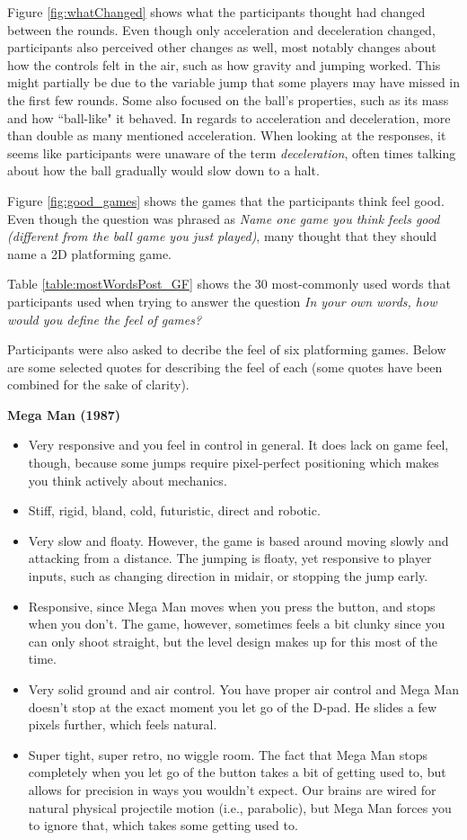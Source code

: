 Figure \ref{fig:whatChanged} shows what the participants thought had changed between the rounds. Even though only acceleration and deceleration changed, participants also perceived other changes as well, most notably changes about how the controls felt in the air, such as how gravity and jumping worked. This might partially be due to the variable jump that some players may have missed in the first few rounds. Some also focused on the ball's properties, such as its mass and how ``ball-like" it behaved. In regards to acceleration and deceleration, more than double as many mentioned acceleration. When looking at the responses, it seems like participants were unaware of the term \textit{deceleration}, often times talking about how the ball gradually would slow down to a halt.

Figure \ref{fig:good_games} shows the games that the participants think feel good. Even though the question was phrased as \textit{Name one game you think feels good (different from the ball game you just played)}, many thought that they should name a 2D platforming game.

Table \ref{table:mostWordsPost_GF} shows the 30 most-commonly used words that participants used when trying to answer the question \textit{In your own words, how would you define the feel of games?}

Participants were also asked to decribe the feel of six platforming games. Below are some selected quotes for describing the feel of each (some quotes have been combined for the sake of clarity).

\textbf{Mega Man (1987)}
\vspace{-5mm}
\begin{itemize}[noitemsep,nolistsep]
\item Very responsive and you feel in control in general. It does lack on game feel, though, because some jumps require pixel-perfect positioning which makes you think actively about mechanics.
\item Stiff, rigid, bland, cold, futuristic, direct and robotic.
\item Very slow and floaty. However, the game is based around moving slowly and attacking from a distance. The jumping is floaty, yet responsive to player inputs, such as changing direction in midair, or stopping the jump early. 
\item Responsive, since Mega Man moves when you press the button, and stops when you don't. The game, however, sometimes feels a bit clunky since you can only shoot straight, but the level design makes up for this most of the time.
\item Very solid ground and air control. You have proper air control and Mega Man doesn't stop at the exact moment you let go of the D-pad. He slides a few pixels further, which feels natural.
\item Super tight, super retro, no wiggle room. The fact that Mega Man stops completely when you let go of the button takes a bit of getting used to, but allows for precision in ways you wouldn't expect. Our brains are wired for natural physical projectile motion (i.e., parabolic), but Mega Man forces you to ignore that, which takes some getting used to.
\end{itemize}


